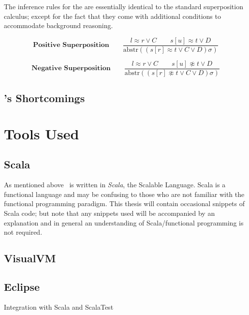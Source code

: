 The inference rules for the {\HSWA} are essentially identical to the standard 
superposition calculus; except for the fact that they come with additional
conditions to accommodate background reasoning.

\[ \textbf{Positive Superposition}\quad\quad \frac{l \approx r \lor C\quad \quad s[u] \approx t \lor D}{\text{abstr}((s[r] \approx t \lor C \lor D)\sigma)} \]

\[ \textbf{Negative Superposition}\quad\quad \frac{l \approx r \lor C\quad \quad s[u] \not\approx t \lor D}{\text{abstr}((s[r] \not\approx t \lor C \lor D)\sigma)} \]

\subsection{\Beagle's Shortcomings}



\section{Tools Used}

\subsection{Scala}
\label{sec:scala}

As mentioned above \beagle\ is written in \emph{Scala}, the Scalable Language. Scala
is a functional language and may be confusing to those who are not familiar with the
functional programming paradigm. This thesis will contain occasional snippets of
Scala code; but note that any snippets used will be accompanied by an explanation
and in general an understanding of Scala/functional programming is not required.

\subsection{VisualVM}

\subsection{Eclipse}
Integration with Scala and ScalaTest

